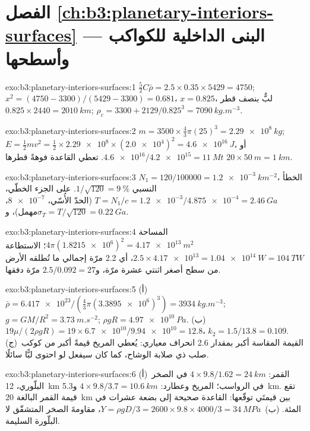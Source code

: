 \section*{الفصل \ref{ch:b3:planetary-interiors-surfaces} --- البنى الداخلية للكواكب وأسطحها}

\begin{solution}{exo:b3:planetary-interiors-surfaces:1}
$\tfrac52C\bar\rho = 2.5\times0.35\times5429 = 4750$; $x^2 = (4750 -
3300)/(5429 - 3300) = 0.681$، $x = 0.825$، لبٌّ بنصف قطر $0.825\times2440 =
\qty{2010}{km}$; $\rho_c = 3300 + 2129/0.825^3 = \qty{7090}{kg.m^{-3}}$.
\end{solution}

\begin{solution}{exo:b3:planetary-interiors-surfaces:2}
$m = 3500\times\tfrac43\pi(25)^3 = \qty{2.29e8}{kg}$; $E = \tfrac12 m v^2 =
\tfrac12\times\num{2.29e8}\times(\num{2.0e4})^2 = \qty{4.6e16}{J}$، أو
$\num{4.6e16}/\num{4.2e15} = \qty{11}{Mt}$. تعطي القاعدة فوهةً قطرها
$20\times\qty{50}{m} = \qty{1}{km}$.
\end{solution}

\begin{solution}{exo:b3:planetary-interiors-surfaces:3}
$N_1 = 120/\num{100000} = \qty{1.2e-3}{km^{-2}}$، الخطأ النسبي $1/\sqrt{120}
= \qty{9}{\percent}$. على الجزء الخطّي، $T = N_1/c = \num{1.2e-3}/\num{4.875e-4}
= \qty{2.46}{Ga}$ (الحدّ الأُسّي، $\num{8e-7}$، مهمل)،
و$\sigma_T = T/\sqrt{120} = \qty{0.22}{Ga}$.
\end{solution}

\begin{solution}{exo:b3:planetary-interiors-surfaces:4}
المساحة $4\pi(\num{1.8215e6})^2 = \qty{4.17e13}{m^2}$؛ الاستطاعة $2.5\times
\num{4.17e13} = \qty{1.04e14}{W} = \qty{104}{TW}$، أي 2.2 مرّة إجمالي ما تُطلقه الأرض
من سطح أصغر اثنتي عشرة مرّة، و$2.5/0.092 = 27$ مرّة
دفقها.
\end{solution}

\begin{solution}{exo:b3:planetary-interiors-surfaces:5}
(أ)~$\bar\rho = \num{6.417e23}/(\tfrac43\pi(\num{3.3895e6})^3) =
\qty{3934}{kg.m^{-3}}$; $g = GM/R^2 = \qty{3.73}{m.s^{-2}}$; $\rho gR =
\qty{4.97e10}{Pa}$. (ب)~$19\mu/(2\rho gR) = 19\times\num{6.7e10}/\num{9.94e10}
= 12.8$، $k_2 = 1.5/13.8 = 0.109$. (ج)~القيمة المقاسة أكبر بمقدار
2.6 انحراف معياري: يُعطي المريخ قيمةً أكبر من كوكب صلب ذي
صلابة الوشاح، كما كان سيفعل لو احتوى لبًّا سائلًا.
\end{solution}

\begin{solution}{exo:b3:planetary-interiors-surfaces:6}
(أ)~القمر: $4\times9.8/1.62 = \qty{24}{km}$ في الصخر البلّوري،
\qty{12}{km} في الرواسب؛ المريخ وعطارد: $4\times9.8/3.7 =
\qty{10.6}{km}$ و\qty{5.3}{km}. تقع قيمة القمر البالغة \qty{20}{km} بين
قيمتَي توقّعها: القاعدة صحيحة إلى بضعة عشرات في المئة. (ب)~$Y =
\rho gD/3 = 2600\times9.8\times4000/3 = \qty{34}{MPa}$، مقاومةَ
الصخر المتشقّق لا البلّورة السليمة.
\end{solution}

